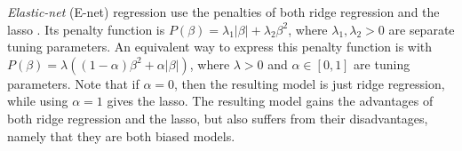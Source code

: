 \documentclass[final,onefignum,onetabnum]{siuro210301}
\newcommand{\argmin}[2]{\underset{#1}{\text{arg min}}\left\{#2\right\}}
\begin{document}

	
	\textit{Elastic-net} (E-net) regression use the penalties of both ridge regression and the lasso \cite{zou2005regularization}. Its penalty function is $P(\beta)=\lambda_1 \vert \beta \vert + \lambda_2 \beta^2$, where $\lambda_1, \lambda_2 > 0$ are separate tuning parameters. An equivalent way to express this penalty function is with $P(\beta) = \lambda((1-\alpha)\beta^2 + \alpha \vert \beta \vert)$, where $\lambda > 0$ and $\alpha \in [0, 1]$ are tuning parameters. Note that if $\alpha = 0$, then the resulting model is just ridge regression, while using $\alpha = 1$ gives the lasso. The resulting model gains the advantages of both ridge regression and the lasso, but also suffers from their disadvantages, namely that they are both biased models.
	
\end{document}
